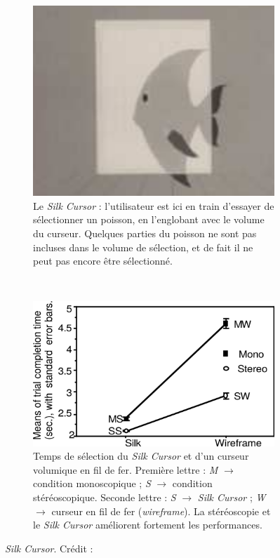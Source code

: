 \begin{appendices}
	\begin{figure}[htbp]
		\begin{subfigure}[t]{0.42\textwidth}
			\centering
			\includegraphics[width=\textwidth]{figures/ch2/silk}
			\caption{Le \emph{Silk Cursor} : l'utilisateur est ici en train d'essayer de sélectionner un poisson, en l'englobant avec le volume du curseur. Quelques parties du poisson ne sont pas incluses dans le volume de sélection, et de fait il ne peut pas encore être sélectionné.}
			\label{fig:silk}
		\end{subfigure}
		~
		\begin{subfigure}[t]{0.56\textwidth}
			\centering
			\includegraphics[width=\textwidth]{figures/ch2/silkPerf}
			\caption{Temps de sélection du \emph{Silk Cursor} et d'un curseur volumique en fil de fer. Première lettre : \emph{M} $\rightarrow$ condition monoscopique ; \emph{S} $\rightarrow$ condition stéréoscopique. Seconde lettre : \emph{S} $\rightarrow$ \emph{Silk Cursor} ; \emph{W} $\rightarrow$ curseur en fil de fer (\emph{wireframe}). La stéréoscopie et le \emph{Silk Cursor} améliorent fortement les performances.}
			\label{fig:silkPerf}
		\end{subfigure}
		\caption[\emph{Silk Cursor}]{\emph{Silk Cursor}. Crédit : \cite{zhai1994silk}}
		\label{fig:silkCursorPerf}
	\end{figure}
	

\end{appendices}
